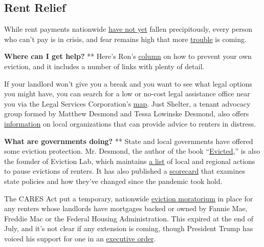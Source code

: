 \hypertarget{rent-relief}{%
\subsection{Rent Relief}\label{rent-relief}}

While rent payments nationwide
\href{https://www.nytimes3xbfgragh.onion/2020/05/31/business/economy/coronavirus-rent-landlords-tenants.html}{have
not yet} fallen precipitously, every person who can't pay is in crisis,
and fear remains high that more
\href{https://www.nytimes3xbfgragh.onion/2020/05/27/us/coronavirus-evictions-renters.html?action=click\&module=RelatedLinks\&pgtype=Article}{trouble}
is coming.

\textbf{Where can I get help?} ** Here's Ron's
\href{https://www.nytimes3xbfgragh.onion/2020/07/11/your-money/coronavirus-eviction-prevention-renters-landlord.html}{column}
on how to prevent your own eviction, and it includes a number of links
with plenty of detail.

If your landlord won't give you a break and you want to see what legal
options you might have, you can search for a low or no-cost legal
assistance office near you via the Legal Services Corporation's
\href{https://www.lsc.gov/what-legal-aid/find-legal-aid}{map}. Just
Shelter, a tenant advocacy group formed by Matthew Desmond and Tessa
Lowinske Desmond, also offers
\href{https://justshelter.org/community-resources/}{information} on
local organizations that can provide advice to renters in distress.

\textbf{What are governments doing?} ** State and local governments have
offered some eviction protection. Mr. Desmond, the author of the book
``\href{https://www.nytimes3xbfgragh.onion/2016/02/28/books/review/matthew-desmonds-evicted-poverty-and-profit-in-the-american-city.html}{Evicted},''
is also the founder of Eviction Lab, which maintains
\href{https://evictionlab.org/covid-eviction-policies/}{a list} of local
and regional actions to pause evictions of renters. It has also
published a
\href{https://evictionlab.org/covid-policy-scorecard/}{scorecard} that
examines state policies and how they've changed since the pandemic took
hold.

The CARES Act put a temporary, nationwide
\href{https://crsreports.congress.gov/product/pdf/IN/IN11320}{eviction
moratorium} in place for any renters whose landlords have mortgages
backed or owned by Fannie Mae, Freddie Mac or the Federal Housing
Administration. This expired at the end of July, and it's not clear if
any extension is coming, though President Trump has voiced his support
for one in an
\href{https://www.whitehouse.gov/presidential-actions/executive-order-fighting-spread-covid-19-providing-assistance-renters-homeowners/}{executive
order}.


